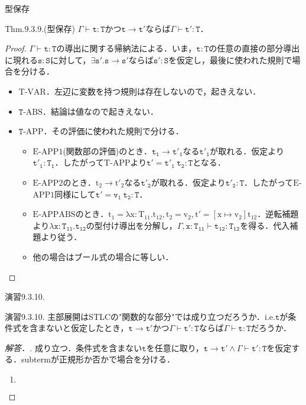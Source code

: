 \documentclass[9pt]{beamer}
\begin{document}
\begin{frame}{型保存}
\begin{alertblock}{Thm.9.3.9.(型保存)}
	$\Gamma\vdash\mathtt{t:T}$かつ$\mathtt{t\rightarrow t'}$ならば$\Gamma\vdash\mathtt{t':T}$．
\end{alertblock}
\begin{proof}
$\Gamma\vdash\mathtt{t:T}$の導出に関する帰納法による．いま，$\mathtt{t:T}$の任意の直接の部分導出に現れる$\mathtt{s:S}$に対して，$\mathtt{\exists s'.s\rightarrow s'}$ならば$\mathtt{s':S}$を仮定し，最後に使われた規則で場合を分ける．\begin{itemize}
\item $\mathrm{T}$-$\mathrm{VAR}$．左辺に変数を持つ規則は存在しないので，起きえない．
\item $\mathtt{T}$-$\mathrm{ABS}$．結論は値なので起きえない．
\item $\mathtt{T}$-$\mathrm{APP}$．その評価に使われた規則で分ける．\begin{itemize}
\item $\mathrm{E}$-$\mathrm{APP1}$(関数部の評価)のとき．$\mathtt{t_{1}\rightarrow t'_{1}}$なる$\mathtt{t'_{1}}$が取れる．仮定より$\mathtt{t'_{1}:T_{1}}$．したがって$\mathrm{T}$-$\mathrm{APP}$より$\mathtt{t' = t'_{1}\ t_{2}:T}$となる．
\item $\mathrm{E}$-$\mathrm{APP2}$のとき．$\mathrm{t_{2}\rightarrow t'_{2}}$なる$\mathtt{t'_{2}}$が取れる．仮定より$\mathtt{t'_{2}:T}$．したがって$\mathrm{E}$-$\mathrm{APP1}$同様にして$\mathtt{t'= v_{1}\ t_{2}:T}$．
\item $\mathrm{E}$-$\mathrm{APPABS}$のとき．$\mathrm{t_{1} = \lambda x:T_{11}. t_{12}, t_{2} = v_{2},t ' = \left[x\mapsto v_{2}\right]t_{12}}$．逆転補題より$\mathtt{\lambda x:T_{11}.t_{12}}$の型付け導出を分解し，$\Gamma,\mathtt{x:T_{11}\vdash t_{12}:T_{12}}$を得る．代入補題より従う．
\item 他の場合はブール式の場合に等しい．
\end{itemize}
\end{itemize}
\end{proof}
\end{frame}
\begin{frame}{演習9.3.10.}
\begin{alertblock}{演習9.3.10.}
主部展開はSTLCの"関数的な部分"では成り立つだろうか．i.e.$\mathtt{t}$が条件式を含まないと仮定したとき，$\mathtt{t \rightarrow t'}$かつ$\Gamma\vdash \mathtt{t' : T}$ならば$\Gamma\vdash \mathtt{t:T}$だろうか．
\end{alertblock}
\begin{proof}[解答．]
成り立つ．条件式を含まない$\mathtt{t}$を任意に取り，$\mathtt{t \rightarrow t'}\land \Gamma \vdash \mathtt{t':T}$を仮定する．subtermが正規形か否かで場合を分ける．
\begin{enumerate}
\item $\mathtt{}$
\end{enumerate}
\end{proof}
\end{frame}
\end{document}
